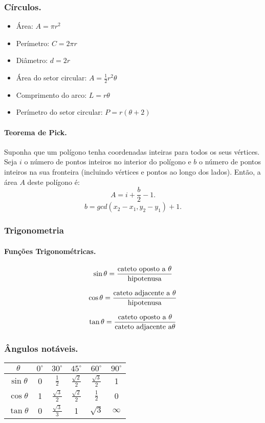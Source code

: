 \subsubsection*{Círculos.}
\begin{multicols}{2}
	\begin{itemize}
		\item Área: $A = \pi r^2$
		\item Perímetro: $C = 2\pi r$
		\item Diâmetro: $d = 2r$
		\item Área do setor circular: $A = \frac{1}{2}r^2\theta$
		\item Comprimento do arco: $L = r\theta$
		\item Perímetro do setor circular: $P = r(\theta+2)$
	\end{itemize}
\end{multicols}

\paragraph{Teorema de Pick.} Suponha que um polígono tenha coordenadas inteiras para todos os seus vértices. Seja $i$ o número de pontos inteiros no interior do polígono e $b$ o número de pontos inteiros na sua fronteira (incluindo vértices e pontos ao longo dos lados). Então, a área $A$ deste polígono é:
$$A = i + \frac{b}{2} -1.$$
$$b = gcd(x_2-x_1,y_2-y_1)+1.$$

\subsubsection{Trigonometria}
\paragraph{Funções Trigonométricas.}
	$$\sin\theta = \frac{\textnormal{cateto oposto a }\theta}{\textnormal{hipotenusa}}$$

	$$\cos\theta = \frac{\textnormal{cateto adjacente a }\theta}{\textnormal{hipotenusa}}$$

	$$\tan\theta = \frac{\textnormal{cateto oposto a }\theta}{\textnormal{cateto adjacente a}\theta}$$

\subsubsection*{Ângulos notáveis.}

\begin{center}
	\begin{tabular}{|c|c c c c c|}
		$\theta$ & $0^{\circ}$ & $30^{\circ}$&$45^{\circ}$&$60^{\circ}$&$90^{\circ}$ \\
		\hline
		$\sin\theta$ &0&$\frac{1}{2}$&$\frac{\sqrt{2}}{2}$&$\frac{\sqrt{3}}{2}$&1 \\
		\hline
		$\cos\theta$ &1&$\frac{\sqrt{3}}{2}$&$\frac{\sqrt{2}}{2}$&$\frac{1}{2}$&0 \\
		\hline
		$\tan\theta$ &0&$\frac{\sqrt{3}}{3}$&1&$\sqrt{3}$&$\infty$ \\
		
	\end{tabular}
\end{center}

